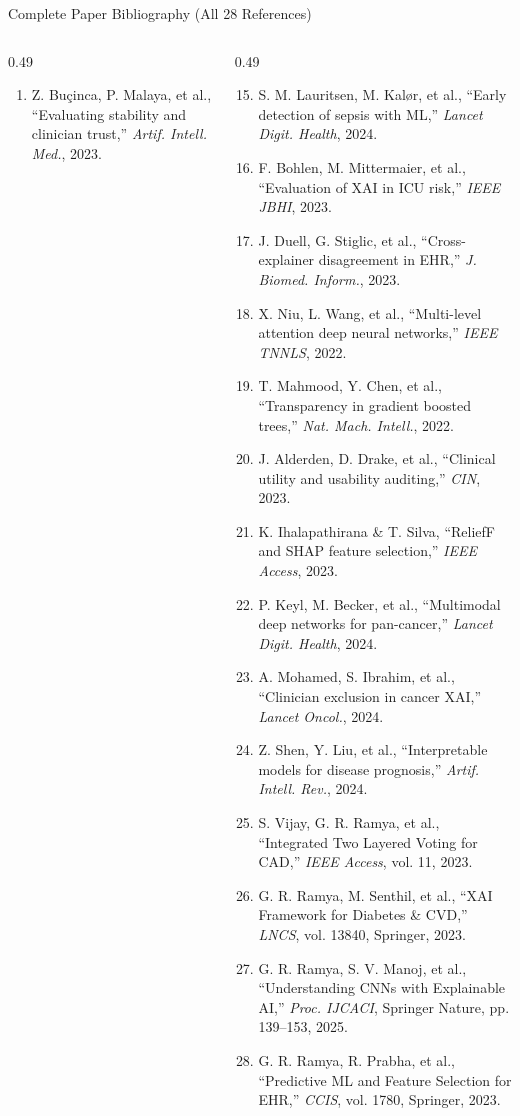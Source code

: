\documentclass[aspectratio=169,10pt]{beamer}
\begin{document}
\begin{frame}{Complete Paper Bibliography (All 28 References)}
\begin{columns}[t]
\begin{column}{0.49\textwidth}
\begin{enumerate}
        \item Z. Bu\c{c}inca, P. Malaya, et al., ``Evaluating stability and clinician trust,'' \textit{Artif. Intell. Med.}, 2023.
      \end{enumerate}
    \end{column}
    \begin{column}{0.49\textwidth}
      \tiny
      \begin{enumerate}\setcounter{enumi}{14}\setlength\itemsep{0.5pt}
        \item S. M. Lauritsen, M. Kal\o r, et al., ``Early detection of sepsis with ML,'' \textit{Lancet Digit. Health}, 2024.
        \item F. Bohlen, M. Mittermaier, et al., ``Evaluation of XAI in ICU risk,'' \textit{IEEE JBHI}, 2023.
        \item J. Duell, G. Stiglic, et al., ``Cross-explainer disagreement in EHR,'' \textit{J. Biomed. Inform.}, 2023.
        \item X. Niu, L. Wang, et al., ``Multi-level attention deep neural networks,'' \textit{IEEE TNNLS}, 2022.
        \item T. Mahmood, Y. Chen, et al., ``Transparency in gradient boosted trees,'' \textit{Nat. Mach. Intell.}, 2022.
        \item J. Alderden, D. Drake, et al., ``Clinical utility and usability auditing,'' \textit{CIN}, 2023.
        \item K. Ihalapathirana \& T. Silva, ``ReliefF and SHAP feature selection,'' \textit{IEEE Access}, 2023.
        \item P. Keyl, M. Becker, et al., ``Multimodal deep networks for pan-cancer,'' \textit{Lancet Digit. Health}, 2024.
        \item A. Mohamed, S. Ibrahim, et al., ``Clinician exclusion in cancer XAI,'' \textit{Lancet Oncol.}, 2024.
        \item Z. Shen, Y. Liu, et al., ``Interpretable models for disease prognosis,'' \textit{Artif. Intell. Rev.}, 2024.
        \item S. Vijay, G. R. Ramya, et al., ``Integrated Two Layered Voting for CAD,'' \textit{IEEE Access}, vol. 11, 2023.
        \item G. R. Ramya, M. Senthil, et al., ``XAI Framework for Diabetes \& CVD,'' \textit{LNCS}, vol. 13840, Springer, 2023.
        \item G. R. Ramya, S. V. Manoj, et al., ``Understanding CNNs with Explainable AI,'' \textit{Proc. IJCACI}, Springer Nature, pp. 139--153, 2025.
        \item G. R. Ramya, R. Prabha, et al., ``Predictive ML and Feature Selection for EHR,'' \textit{CCIS}, vol. 1780, Springer, 2023.
      \end{enumerate}
    \end{column}
  \end{columns}
\end{frame}
\end{document}
